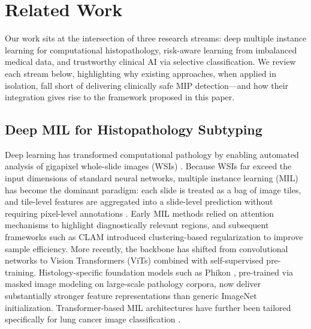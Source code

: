 \section{Related Work}\label{S6-3}                                                                                                                                                                           
                                                                                                                                                                                                               
  Our work sits at the intersection of three research streams: deep multiple instance learning for computational histopathology, risk-aware learning from imbalanced medical data, and trustworthy clinical AI 
  via selective classification. We review each stream below, highlighting why existing approaches, when applied in isolation, fall short of delivering clinically safe MIP detection---and how their           
  integration gives rise to the framework proposed in this paper.                                                                                                                                              
                  
  \subsection{Deep MIL for Histopathology Subtyping}                                                                                                                                                           
   
  Deep learning has transformed computational pathology by enabling automated analysis of gigapixel whole-slide images (WSIs) \cite{coudray2018classification, campanella2019clinical}. Because WSIs far exceed
   the input dimensions of standard neural networks, multiple instance learning (MIL) has become the dominant paradigm: each slide is treated as a bag of image tiles, and tile-level features are aggregated
  into a slide-level prediction without requiring pixel-level annotations \cite{ilse2018attention}. Early MIL methods relied on attention mechanisms to highlight diagnostically relevant regions, and         
  subsequent frameworks such as CLAM \cite{lu2021data} introduced clustering-based regularization to improve sample efficiency. More recently, the backbone has shifted from convolutional networks to Vision
  Transformers (ViTs) \cite{dosovitskiy2020image} combined with self-supervised pre-training. Histology-specific foundation models such as Phikon \cite{filiot2023scaling}, pre-trained via masked image
  modeling on large-scale pathology corpora, now deliver substantially stronger feature representations than generic ImageNet initialization. Transformer-based MIL architectures have further been tailored
  specifically for lung cancer image classification \cite{an2024transformer}.

